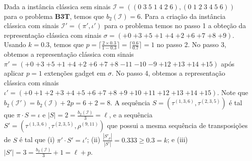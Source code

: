 \begin{example}\label{example:NDFPEMFC}
  Dada a instância clássica sem sinais $\mathcal{I} = ((0 \; 3 \; 5 \; 1 \; 4 \; 2 \; 6),(0 \; 1 \; 2 \; 3 \; 4 \; 5 \; 6))$ para o problema \textbf{B3T}, temos que $b_2(\mathcal{I}) = 6$. Para a criação da instância clássica com sinais $\mathcal{I'}=(\pi',\iota')$ para o problema \SbPRT{} temos no passo 1 a obteção da representação clássica com sinais $\sigma = ({+0} \; {+3} \; {+5} \; {+1} \; {+4} \; {+2} \; {+6} \; {+7} \; {+8} \; {+9})$. Usando $k = 0.3$, temos que $p = \lceil\frac{2\times 0.3}{1 - 0.3}\rceil = \lceil\frac{0.6}{0.7}\rceil = 1$ no passo 2. No passo 3, obtemos a representação clássica com sinais $\pi' = ({+0} \; {+3} \; {+5} \; {+1} \; {+4} \; {+2} \; {+6} \; {+7} \; {+8} \; {-11} \; {-10} \; {-9} \; {+12} \; {+13} \; {+14} \; {+15})$ após aplicar $p = 1$ extenções gadget em $\sigma$. No passo 4, obtemos a representação clássica com sinais $\iota' = ({+0} \; {+1} \; {+2} \; {+3} \; {+4} \; {+5} \; {+6} \; {+7} \; {+8} \; {+9} \; {+10} \; {+11} \; {+12} \; {+13} \; {+14} \; {+15})$. Note que $b_2(\mathcal{I'}) = b_2(\mathcal{I}) + 2p = 6 + 2 = 8$. A sequência $S = (\tau^{(1,3,6)},\tau^{(2,3,5)})$ é tal que $\pi \cdot S = \iota$ e $|S| = 2 = \frac{b_2(\mathcal{I})}{3} = \ell$, e a sequência $S' = (\tau^{(1,3,6)},\tau^{(2,3,5)},\rho^{(9,11)})$ que possui a mesma sequência de transposições de $S$ é tal que (i) $\pi' \cdot S' = \iota'$; (ii) $\frac{|S'_\rho|}{|S'|} = 0.333 \ge 0.3 = k$; e (iii) $|S'| = 3 = \frac{b_2(\mathcal{I})}{3} + 1 = \ell+p$.
\end{example}